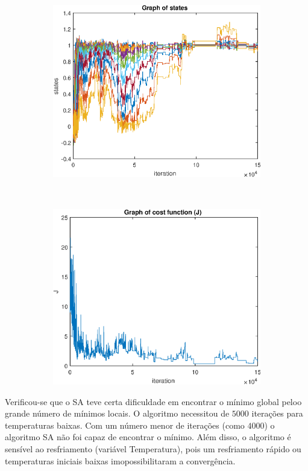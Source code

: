 \documentclass[12pt]{article}
\newenvironment{exercise}[2][Exercício]{\begin{trivlist}
\item[\hskip \labelsep {\bfseries #1}\hskip \labelsep {\bfseries #2.}]}{\end{trivlist}}
\begin{document}
\begin{exercise}{3}
\begin{figure}[H]
    \centering
    \begin{subfigure}[b]{0.45\textwidth}
        \includegraphics[width=\textwidth]{figs/ex3_states.eps}
    \end{subfigure}
    ~ 
    \begin{subfigure}[b]{0.45\textwidth}
        \includegraphics[width=\textwidth]{figs/ex3_j.eps}
    \end{subfigure}
\end{figure}

Verificou-se que o SA teve certa dificuldade em encontrar o mínimo global peloo
grande número de mínimos locais. O algoritmo necessitou de $5000$ iterações
para temperaturas baixas. Com um número menor de iterações (como $4000$) o
algoritmo SA não foi capaz de encontrar o mínimo. Além disso, o algoritmo é
sensível ao resfriamento (variável Temperatura), pois um resfriamento rápido ou
temperaturas iniciais baixas imopossibilitaram a convergência. 

\end{exercise}
 
\end{document}
